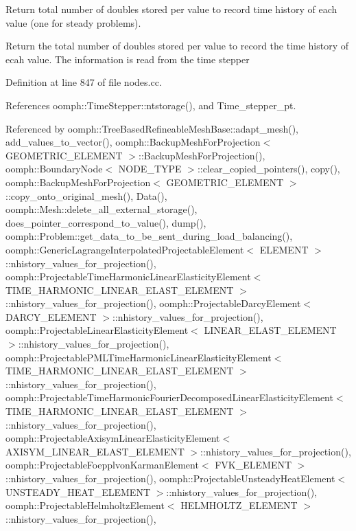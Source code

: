 Return total number of doubles stored per value to record time history of each value (one for steady problems). 

Return the total number of doubles stored per value to record the time history of ecah value. The information is read from the time stepper 

Definition at line 847 of file nodes.\+cc.



References oomph\+::\+Time\+Stepper\+::ntstorage(), and Time\+\_\+stepper\+\_\+pt.



Referenced by oomph\+::\+Tree\+Based\+Refineable\+Mesh\+Base\+::adapt\+\_\+mesh(), add\+\_\+values\+\_\+to\+\_\+vector(), oomph\+::\+Backup\+Mesh\+For\+Projection$<$ G\+E\+O\+M\+E\+T\+R\+I\+C\+\_\+\+E\+L\+E\+M\+E\+N\+T $>$\+::\+Backup\+Mesh\+For\+Projection(), oomph\+::\+Boundary\+Node$<$ N\+O\+D\+E\+\_\+\+T\+Y\+P\+E $>$\+::clear\+\_\+copied\+\_\+pointers(), copy(), oomph\+::\+Backup\+Mesh\+For\+Projection$<$ G\+E\+O\+M\+E\+T\+R\+I\+C\+\_\+\+E\+L\+E\+M\+E\+N\+T $>$\+::copy\+\_\+onto\+\_\+original\+\_\+mesh(), Data(), oomph\+::\+Mesh\+::delete\+\_\+all\+\_\+external\+\_\+storage(), does\+\_\+pointer\+\_\+correspond\+\_\+to\+\_\+value(), dump(), oomph\+::\+Problem\+::get\+\_\+data\+\_\+to\+\_\+be\+\_\+sent\+\_\+during\+\_\+load\+\_\+balancing(), oomph\+::\+Generic\+Lagrange\+Interpolated\+Projectable\+Element$<$ E\+L\+E\+M\+E\+N\+T $>$\+::nhistory\+\_\+values\+\_\+for\+\_\+projection(), oomph\+::\+Projectable\+Time\+Harmonic\+Linear\+Elasticity\+Element$<$ T\+I\+M\+E\+\_\+\+H\+A\+R\+M\+O\+N\+I\+C\+\_\+\+L\+I\+N\+E\+A\+R\+\_\+\+E\+L\+A\+S\+T\+\_\+\+E\+L\+E\+M\+E\+N\+T $>$\+::nhistory\+\_\+values\+\_\+for\+\_\+projection(), oomph\+::\+Projectable\+Darcy\+Element$<$ D\+A\+R\+C\+Y\+\_\+\+E\+L\+E\+M\+E\+N\+T $>$\+::nhistory\+\_\+values\+\_\+for\+\_\+projection(), oomph\+::\+Projectable\+Linear\+Elasticity\+Element$<$ L\+I\+N\+E\+A\+R\+\_\+\+E\+L\+A\+S\+T\+\_\+\+E\+L\+E\+M\+E\+N\+T $>$\+::nhistory\+\_\+values\+\_\+for\+\_\+projection(), oomph\+::\+Projectable\+P\+M\+L\+Time\+Harmonic\+Linear\+Elasticity\+Element$<$ T\+I\+M\+E\+\_\+\+H\+A\+R\+M\+O\+N\+I\+C\+\_\+\+L\+I\+N\+E\+A\+R\+\_\+\+E\+L\+A\+S\+T\+\_\+\+E\+L\+E\+M\+E\+N\+T $>$\+::nhistory\+\_\+values\+\_\+for\+\_\+projection(), oomph\+::\+Projectable\+Time\+Harmonic\+Fourier\+Decomposed\+Linear\+Elasticity\+Element$<$ T\+I\+M\+E\+\_\+\+H\+A\+R\+M\+O\+N\+I\+C\+\_\+\+L\+I\+N\+E\+A\+R\+\_\+\+E\+L\+A\+S\+T\+\_\+\+E\+L\+E\+M\+E\+N\+T $>$\+::nhistory\+\_\+values\+\_\+for\+\_\+projection(), oomph\+::\+Projectable\+Axisym\+Linear\+Elasticity\+Element$<$ A\+X\+I\+S\+Y\+M\+\_\+\+L\+I\+N\+E\+A\+R\+\_\+\+E\+L\+A\+S\+T\+\_\+\+E\+L\+E\+M\+E\+N\+T $>$\+::nhistory\+\_\+values\+\_\+for\+\_\+projection(), oomph\+::\+Projectable\+Foepplvon\+Karman\+Element$<$ F\+V\+K\+\_\+\+E\+L\+E\+M\+E\+N\+T $>$\+::nhistory\+\_\+values\+\_\+for\+\_\+projection(), oomph\+::\+Projectable\+Unsteady\+Heat\+Element$<$ U\+N\+S\+T\+E\+A\+D\+Y\+\_\+\+H\+E\+A\+T\+\_\+\+E\+L\+E\+M\+E\+N\+T $>$\+::nhistory\+\_\+values\+\_\+for\+\_\+projection(), oomph\+::\+Projectable\+Helmholtz\+Element$<$ H\+E\+L\+M\+H\+O\+L\+T\+Z\+\_\+\+E\+L\+E\+M\+E\+N\+T $>$\+::nhistory\+\_\+values\+\_\+for\+\_\+projection(), 